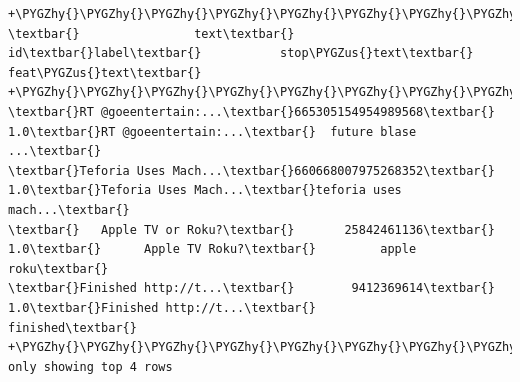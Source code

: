 \documentclass[letterpaper,11pt,english]{sphinxmanual}
\def\PYGZus{\char`\_}
\def\PYGZhy{\char`\-}
\begin{document}
\begin{Verbatim}[commandchars=\\\{\}]
+\PYGZhy{}\PYGZhy{}\PYGZhy{}\PYGZhy{}\PYGZhy{}\PYGZhy{}\PYGZhy{}\PYGZhy{}\PYGZhy{}\PYGZhy{}\PYGZhy{}\PYGZhy{}\PYGZhy{}\PYGZhy{}\PYGZhy{}\PYGZhy{}\PYGZhy{}\PYGZhy{}\PYGZhy{}\PYGZhy{}+\PYGZhy{}\PYGZhy{}\PYGZhy{}\PYGZhy{}\PYGZhy{}\PYGZhy{}\PYGZhy{}\PYGZhy{}\PYGZhy{}\PYGZhy{}\PYGZhy{}\PYGZhy{}\PYGZhy{}\PYGZhy{}\PYGZhy{}\PYGZhy{}\PYGZhy{}\PYGZhy{}+\PYGZhy{}\PYGZhy{}\PYGZhy{}\PYGZhy{}\PYGZhy{}+\PYGZhy{}\PYGZhy{}\PYGZhy{}\PYGZhy{}\PYGZhy{}\PYGZhy{}\PYGZhy{}\PYGZhy{}\PYGZhy{}\PYGZhy{}\PYGZhy{}\PYGZhy{}\PYGZhy{}\PYGZhy{}\PYGZhy{}\PYGZhy{}\PYGZhy{}\PYGZhy{}\PYGZhy{}\PYGZhy{}+\PYGZhy{}\PYGZhy{}\PYGZhy{}\PYGZhy{}\PYGZhy{}\PYGZhy{}\PYGZhy{}\PYGZhy{}\PYGZhy{}\PYGZhy{}\PYGZhy{}\PYGZhy{}\PYGZhy{}\PYGZhy{}\PYGZhy{}\PYGZhy{}\PYGZhy{}\PYGZhy{}\PYGZhy{}\PYGZhy{}+
\textbar{}                text\textbar{}                id\textbar{}label\textbar{}           stop\PYGZus{}text\textbar{}           feat\PYGZus{}text\textbar{}
+\PYGZhy{}\PYGZhy{}\PYGZhy{}\PYGZhy{}\PYGZhy{}\PYGZhy{}\PYGZhy{}\PYGZhy{}\PYGZhy{}\PYGZhy{}\PYGZhy{}\PYGZhy{}\PYGZhy{}\PYGZhy{}\PYGZhy{}\PYGZhy{}\PYGZhy{}\PYGZhy{}\PYGZhy{}\PYGZhy{}+\PYGZhy{}\PYGZhy{}\PYGZhy{}\PYGZhy{}\PYGZhy{}\PYGZhy{}\PYGZhy{}\PYGZhy{}\PYGZhy{}\PYGZhy{}\PYGZhy{}\PYGZhy{}\PYGZhy{}\PYGZhy{}\PYGZhy{}\PYGZhy{}\PYGZhy{}\PYGZhy{}+\PYGZhy{}\PYGZhy{}\PYGZhy{}\PYGZhy{}\PYGZhy{}+\PYGZhy{}\PYGZhy{}\PYGZhy{}\PYGZhy{}\PYGZhy{}\PYGZhy{}\PYGZhy{}\PYGZhy{}\PYGZhy{}\PYGZhy{}\PYGZhy{}\PYGZhy{}\PYGZhy{}\PYGZhy{}\PYGZhy{}\PYGZhy{}\PYGZhy{}\PYGZhy{}\PYGZhy{}\PYGZhy{}+\PYGZhy{}\PYGZhy{}\PYGZhy{}\PYGZhy{}\PYGZhy{}\PYGZhy{}\PYGZhy{}\PYGZhy{}\PYGZhy{}\PYGZhy{}\PYGZhy{}\PYGZhy{}\PYGZhy{}\PYGZhy{}\PYGZhy{}\PYGZhy{}\PYGZhy{}\PYGZhy{}\PYGZhy{}\PYGZhy{}+
\textbar{}RT @goeentertain:...\textbar{}665305154954989568\textbar{}  1.0\textbar{}RT @goeentertain:...\textbar{}  future blase   ...\textbar{}
\textbar{}Teforia Uses Mach...\textbar{}660668007975268352\textbar{}  1.0\textbar{}Teforia Uses Mach...\textbar{}teforia uses mach...\textbar{}
\textbar{}   Apple TV or Roku?\textbar{}       25842461136\textbar{}  1.0\textbar{}      Apple TV Roku?\textbar{}         apple  roku\textbar{}
\textbar{}Finished http://t...\textbar{}        9412369614\textbar{}  1.0\textbar{}Finished http://t...\textbar{}            finished\textbar{}
+\PYGZhy{}\PYGZhy{}\PYGZhy{}\PYGZhy{}\PYGZhy{}\PYGZhy{}\PYGZhy{}\PYGZhy{}\PYGZhy{}\PYGZhy{}\PYGZhy{}\PYGZhy{}\PYGZhy{}\PYGZhy{}\PYGZhy{}\PYGZhy{}\PYGZhy{}\PYGZhy{}\PYGZhy{}\PYGZhy{}+\PYGZhy{}\PYGZhy{}\PYGZhy{}\PYGZhy{}\PYGZhy{}\PYGZhy{}\PYGZhy{}\PYGZhy{}\PYGZhy{}\PYGZhy{}\PYGZhy{}\PYGZhy{}\PYGZhy{}\PYGZhy{}\PYGZhy{}\PYGZhy{}\PYGZhy{}\PYGZhy{}+\PYGZhy{}\PYGZhy{}\PYGZhy{}\PYGZhy{}\PYGZhy{}+\PYGZhy{}\PYGZhy{}\PYGZhy{}\PYGZhy{}\PYGZhy{}\PYGZhy{}\PYGZhy{}\PYGZhy{}\PYGZhy{}\PYGZhy{}\PYGZhy{}\PYGZhy{}\PYGZhy{}\PYGZhy{}\PYGZhy{}\PYGZhy{}\PYGZhy{}\PYGZhy{}\PYGZhy{}\PYGZhy{}+\PYGZhy{}\PYGZhy{}\PYGZhy{}\PYGZhy{}\PYGZhy{}\PYGZhy{}\PYGZhy{}\PYGZhy{}\PYGZhy{}\PYGZhy{}\PYGZhy{}\PYGZhy{}\PYGZhy{}\PYGZhy{}\PYGZhy{}\PYGZhy{}\PYGZhy{}\PYGZhy{}\PYGZhy{}\PYGZhy{}+
only showing top 4 rows
\end{Verbatim}
\end{document}
